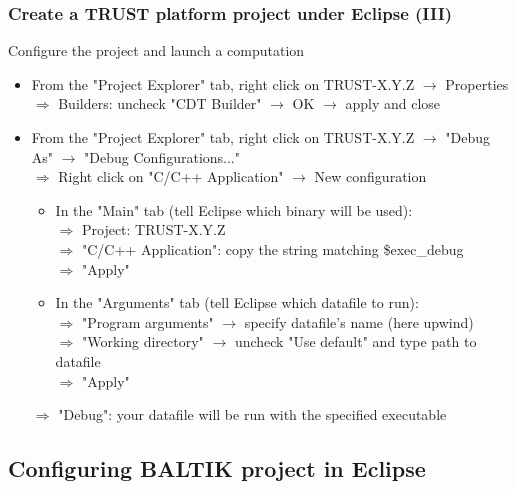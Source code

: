 \documentclass[10pt, hyperref={unicode=true,pdfusetitle, bookmarks=true,bookmarksnumbered=false,bookmarksopen=false, breaklinks=false,pdfborder={0 0 1},backref=true,colorlinks=true,linkcolor=darkblue,pageanchor, urlcolor=darkblue}]{beamer}
\begin{document}
\begin{frame}
\frametitle{Create a TRUST platform project under Eclipse (III)}

\begin{exampleblock}{Configure the project and launch a computation}
\begin{itemize}
\item From the "Project Explorer" tab, right click on TRUST-X.Y.Z $\rightarrow$ Properties \\
  $\Rightarrow$ Builders: uncheck "CDT Builder" $\rightarrow$ OK $\rightarrow$ apply and close
  \vspace{0.1cm}
\item From the "Project Explorer" tab, right click on TRUST-X.Y.Z $\rightarrow$ "Debug As" $\rightarrow$ "Debug Configurations..."\\
  \vspace{0.1cm}
  $\Rightarrow$ Right click on "C/C++ Application" $\rightarrow$ New configuration
  \vspace{0.1cm}
  \begin{itemize}
  \item In the "Main" tab (tell Eclipse which binary will be used): \\
  $\Rightarrow$ Project: TRUST-X.Y.Z \\
  $\Rightarrow$ "C/C++ Application": copy the string matching \$exec\_debug \\
  $\Rightarrow$ "Apply" \\
  \vspace{0.1cm}
  \item In the "Arguments" tab (tell Eclipse which datafile to run):\\
  $\Rightarrow$ "Program arguments" $\rightarrow$ specify datafile's name (here upwind) \\
  $\Rightarrow$ "Working directory" $\rightarrow$ uncheck "Use default" and type path to datafile \\
  $\Rightarrow$ "Apply"
  \end{itemize}
  \vspace{0.1cm}
  $\Rightarrow$ "Debug": your datafile will be run with the specified executable
\end{itemize}
\end{exampleblock}

\end{frame}


\subsection{\bf{Configuring BALTIK project in Eclipse}}
\end{document}
